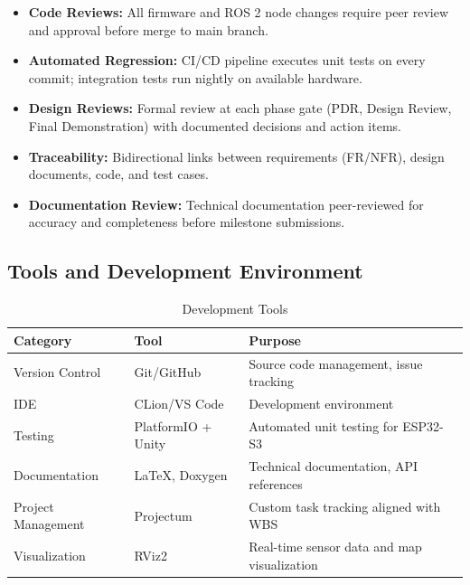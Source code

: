 \begin{itemize}
    \item \textbf{Code Reviews:} All firmware and ROS 2 node changes require peer review and approval before merge to main branch.
    \item \textbf{Automated Regression:} CI/CD pipeline executes unit tests on every commit; integration tests run nightly on available hardware.
    \item \textbf{Design Reviews:} Formal review at each phase gate (PDR, Design Review, Final Demonstration) with documented decisions and action items.
    \item \textbf{Traceability:} Bidirectional links between requirements (FR/NFR), design documents, code, and test cases.
    \item \textbf{Documentation Review:} Technical documentation peer-reviewed for accuracy and completeness before milestone submissions.
\end{itemize}

\subsection{Tools and Development Environment}

\begin{table}[H]
    \centering
    \caption{Development Tools}
    \label{tab:dev_tools}
    \begin{tabular}{@{}lll@{}}
        \toprule
        \textbf{Category} & \textbf{Tool} & \textbf{Purpose} \\
        \midrule
        Version Control & Git/GitHub & Source code management, issue tracking \\
        IDE & CLion/VS Code & Development environment \\
        Testing & PlatformIO + Unity & Automated unit testing for ESP32-S3 \\
        Documentation & \LaTeX, Doxygen & Technical documentation, API references \\
        Project Management & Projectum & Custom task tracking aligned with WBS \\
        Visualization & RViz2 & Real-time sensor data and map visualization \\
        \bottomrule
    \end{tabular}
\end{table}

